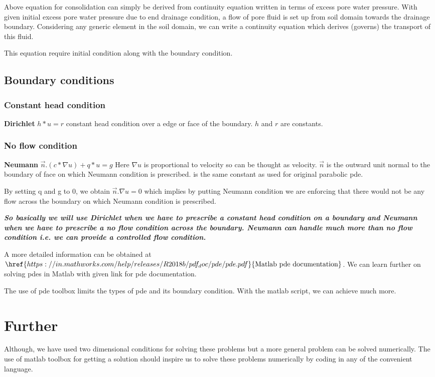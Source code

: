 \documentclass[12pt,longbibliography]{article}
\begin{document}
Above equation for consolidation can simply be derived from continuity equation written in terms of excess pore water pressure. With given initial excess pore water pressure due to end drainage condition, a flow of pore fluid is set up from soil domain towards the drainage boundary. Considering any generic element in the soil domain, we can write a continuity equation which derives (governs) the transport of this fluid. 

This equation require initial condition along with the boundary condition.

\subsection{Boundary conditions}
\subsubsection{Constant head condition}
\textbf{Dirichlet} $h*u=r$  constant head condition over a edge or face of the boundary. $h$ and $r$ are constants.

\subsubsection{No flow condition}
\textbf{Neumann} $\vec{n}.\left(c*\nabla{u}\right)+q*u=g$ Here $\nabla{u}$ is proportional to velocity so can be thought as velocity. $\vec{n}$ is the outward unit normal to the boundary of face on which Neumann condition is prescribed. is the same constant as used for original parabolic pde.

By setting q and g to 0, we obtain $\vec{n}.\nabla{u} = 0$ which implies by putting Neumann condition we are enforcing that there would not be any flow across the boundary on which Neumann condition is prescribed.

\textbf{\textit{So basically we will use Dirichlet when we have to prescribe a constant head condition on a boundary and Neumann when we have to prescribe a no flow condition across the boundary. Neumann can handle much more than no flow condition i.e. we can provide a controlled flow condition.}}

A more detailed information can be obtained at 
$\href{https://in.mathworks.com/help/releases/R2018b/pdf_doc/pde/pde.pdf}{\text{Matlab pde documentation}}$. We can learn further on solving pdes in Matlab with given link for pde documentation.

The use of pde toolbox limits the types of pde and its boundary condition. With the matlab script, we can achieve much more.

\section{Further}
Although, we have used two dimensional conditions for solving these problems but a more general problem can be solved numerically. The use of matlab toolbox for getting a solution should inspire us to solve these problems numerically by coding in any of the convenient language.

%	
\end{document}
